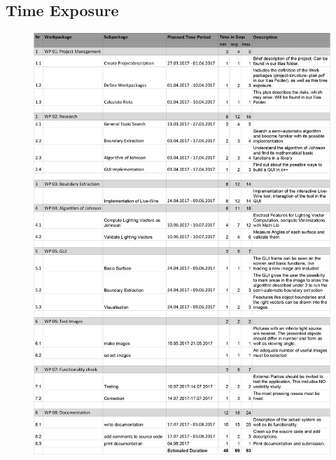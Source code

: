\subsection{Time Exposure} \label{sec:timeExposure}
\begin{figure}[H] 
	\center 
	\includegraphics[scale = 0.85]{Images/Project Description and Time Exposure.jpg}		
\end{figure}



